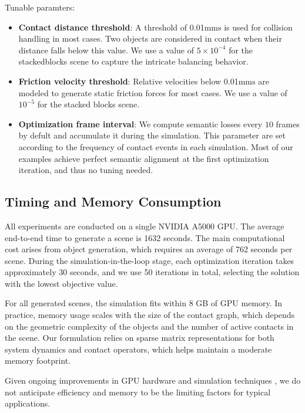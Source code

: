 Tunable paramters:
\begin{itemize}
    \item \textbf{Contact distance threshold}:  
    A threshold of 0.01$\mathrm{mms}$ is used for collision handling in most cases.  
    Two objects are considered in contact when their distance falls below this value. We use a value of $5 \times 10^{-4}$ for the stackedblocks scene to capture the intricate balancing behavior.

    \item \textbf{Friction velocity threshold}:  
    Relative velocities below 0.01$\mathrm{mms}$ are modeled to generate static friction forces for most cases. We use a value of $10^{-5}$ for the stacked blocks scene.

    \item \textbf{Optimization frame interval}:  
    We compute semantic losses every $10$ frames by defult and accumulate it during the simulation. This parameter are set according to the frequency of contact events in each simulation. Most of our examples achieve perfect semantic alignment at the first optimization iteration, and thus no tuning needed.
\end{itemize}

\subsection{Timing and Memory Consumption}

All experiments are conducted on a single NVIDIA A5000 GPU. The average end-to-end time to generate a scene is 1632 seconds. The main computational cost arises from object generation, which requires an average of 762 seconds per scene. During the simulation-in-the-loop stage, each optimization iteration takes approximately 30 seconds, and we use 50 iterations in total, selecting the solution with the lowest objective value.

For all generated scenes, the simulation fits within 8 GB of GPU memory. In practice, memory usage scales with the size of the contact graph, which depends on the geometric complexity of the objects and the number of active contacts in the scene. Our formulation relies on sparse matrix representations for both system dynamics and contact operators, which helps maintain a moderate memory footprint. 

Given ongoing improvements in GPU hardware and simulation techniques \cite{li2023subspace,lan2023second,lan2025jgs2}, we do not anticipate efficiency and memory to be the limiting factors for typical applications.


